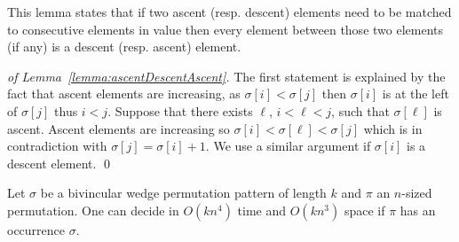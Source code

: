 \documentclass[a4paper]{llncs}
\newcommand{\ppattern}{\sigma}
\begin{document}
This lemma states that if two ascent (resp. descent) elements
need to be matched to consecutive elements in value then every element between those two elements (if any) is a descent (resp. ascent) element. 

\begin{proof}[of Lemma~\ref{lemma:ascentDescentAscent}]
The first statement is explained by the fact that ascent elements are increasing,
as $\sigma[i]<\sigma[j]$ then
$\sigma[i]$ is at the left of $\sigma[j]$ thus $i<j$. 
Suppose that there exists $\ell$, $i<\ell<j$,
such that $\ppattern[\ell]$ is ascent. Ascent elements are increasing  so $\sigma[i]<\sigma[\ell]<\sigma[j]$ which is in contradiction with $\sigma[j]=\sigma[i]+1$.
We use a similar argument if $\sigma[i]$ is a descent element.
\qed
\end{proof}

\begin{proposition}
\label{Proposition:bivincular pattern}
Let $\sigma$ be a bivincular wedge permutation pattern of length $k$
and $\pi$ an $n$-sized permutation.
One can decide in $O(kn^4)$ time
and $O(kn^3)$ space if $\pi$ has an occurrence $\sigma$.
\end{proposition}
\end{document}
